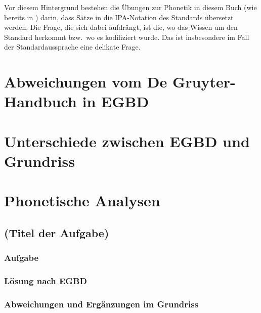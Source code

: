 Vor diesem Hintergrund bestehen die Übungen zur Phonetik in diesem Buch (wie bereits in \EGBD) darin, dass Sätze in die IPA-Notation des Standards übersetzt werden.
Die Frage, die sich dabei aufdrängt, ist die, wo das Wissen um den Standard herkommt bzw.\ wo es kodifiziert wurde.
Das ist insbesondere im Fall der Standardaussprache eine delikate Frage.

\citet{DeppermannEa2013,Kleiner2014}

\section{Abweichungen vom De Gruyter-Handbuch in EGBD}
\label{sec:phonetik:abweichungenvomdegruyterhandbuchinegbd}

\section{Unterschiede zwischen EGBD und Grundriss}
\label{sec:phonetik:unterschiedezwischenegbdundgrundriss}

\section{Phonetische Analysen}
\label{sec:phonetik:phonetischeanalysen}

\subsection{(Titel der Aufgabe)}

\subsubsection{Aufgabe}

\subsubsection{Lösung nach EGBD}

\subsubsection{Abweichungen und Ergänzungen im Grundriss}

